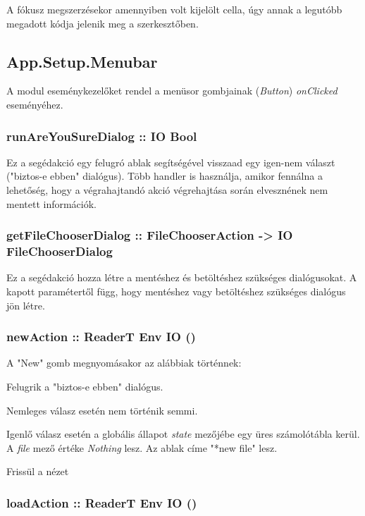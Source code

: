 A fókusz megszerzésekor amennyiben volt kijelölt cella, úgy annak a legutóbb megadott kódja jelenik meg a szerkesztőben.

\subsection{App.Setup.Menubar}

A modul eseménykezelőket rendel a menüsor gombjainak (\textit{Button}) \textit{onClicked} eseményéhez.

\subsubsection{runAreYouSureDialog :: IO Bool}

Ez a segédakció egy felugró ablak segítségével visszaad egy igen-nem választ ("biztos-e ebben" dialógus). Több handler is használja, amikor fennálna a lehetőség, hogy a végrahajtandó akció végrehajtása során elvesznének nem mentett információk.

\subsubsection{getFileChooserDialog :: FileChooserAction -> IO FileChooserDialog}

Ez a segédakció hozza létre a mentéshez és betöltéshez szükséges dialógusokat. A kapott paramétertől függ, hogy mentéshez vagy betöltéshez szükséges dialógus jön létre.

\subsubsection{newAction :: ReaderT Env IO ()}

A "New" gomb megnyomásakor az alábbiak történnek:
\begin{compactenum}
	\item Felugrik a "biztos-e ebben" dialógus.
	\item Nemleges válasz esetén nem történik semmi.
	\item Igenlő válasz esetén a globális állapot \textit{state} mezőjébe egy üres számolótábla kerül. A \textit{file} mező értéke \textit{Nothing} lesz. Az ablak címe "*new file" lesz.
	\item Frissül a nézet
\end{compactenum}

\subsubsection{loadAction :: ReaderT Env IO ()}

